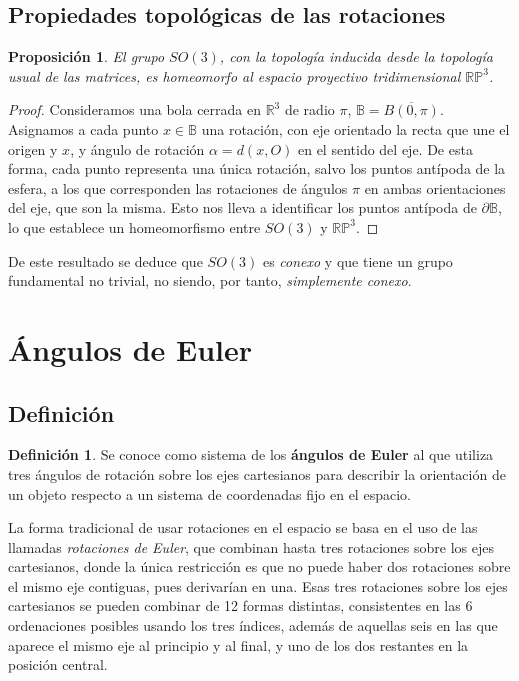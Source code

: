 \documentclass{article}
\theoremstyle{plain}
\newtheorem{proposition}{Proposición}
\theoremstyle{definition}
\newtheorem{definition}{Definición}
\theoremstyle{remark}
\begin{document}
\subsection{Propiedades topológicas de las rotaciones}
\begin{proposition}
  El grupo $SO(3)$, con la topología inducida desde la topología usual
  de las matrices, es homeomorfo al espacio proyectivo tridimensional
  $\mathbb{RP}^3$.
\end{proposition}
\begin{proof}
  Consideramos una bola cerrada en $\mathbb R^3$ de radio $\pi$,
  $\mathbb B = \overline{B(0, \pi)}$. Asignamos a cada punto $x \in \mathbb B$
  una rotación, con eje orientado la recta que une el origen y $x$, y ángulo de
  rotación $\alpha = d(x, O)$ en el sentido del eje.
  De esta forma, cada punto representa una única rotación, salvo los
  puntos antípoda de la esfera, a los que corresponden las rotaciones de ángulos
  $\pi$ en ambas orientaciones del eje, que son la misma. Esto nos lleva a identificar
  los puntos antípoda de $\partial \mathbb B$, lo que establece un
  homeomorfismo entre $SO(3)$ y $\mathbb{RP}^3$.
\end{proof}


De este resultado se deduce que $SO(3)$ es \textit{conexo} y que tiene un grupo
fundamental no trivial, no siendo, por tanto, \textit{simplemente conexo}.


\section{Ángulos de Euler}
\subsection{Definición}

\begin{definition}
  Se conoce como sistema de los \textbf{ángulos de Euler} al que
  utiliza tres ángulos de rotación sobre los ejes cartesianos para
  describir la orientación de un objeto respecto a un sistema de
  coordenadas fijo en el espacio.
\end{definition}

La forma tradicional de usar rotaciones en el espacio se basa en el
uso de las llamadas \textit{rotaciones de Euler}, que combinan hasta tres
rotaciones sobre los ejes cartesianos, donde la única restricción es
que no puede haber dos rotaciones sobre el mismo eje contiguas, pues
derivarían en una. Esas tres rotaciones sobre los ejes cartesianos se
pueden combinar de 12 formas distintas, consistentes en las 6
ordenaciones posibles usando los tres índices, además de aquellas seis
en las que aparece el mismo eje al principio y al final, y uno de los
dos restantes en la posición central. %
\end{document}
